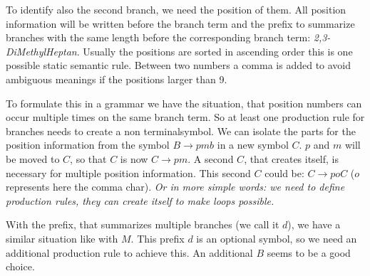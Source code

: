 \documentclass[
fontsize=11pt,
paper=a4,
abstract=true,
numbers=noenddot,
listof=totoc,
bibliography=totoc,
twoside,
open=right,
cleardoublepage=plain,
parskip=half+, %
BCOR=1cm, %
]{scrreprt}
\newcommand{\dashAndSpace}{\textendash \space}
\newcommand{\nonterminal}{non terminal}
\begin{document}
To identify also the second branch, we need the position of them. All position information will be written before the branch term and the prefix to summarize branches with the same length before the corresponding branch term: \emph{2,3-DiMethylHeptan}. Usually the positions are sorted in ascending order \dashAndSpace this is one possible static semantic rule. Between two numbers a comma is added to avoid ambiguous meanings if the positions larger than 9.

To formulate this in a grammar we have the situation, that position numbers can occur multiple times on the same branch term. So at least one production rule for branches needs to create a \nonterminal\space symbol. We can isolate the parts for the position information from the symbol $B \rightarrow pmb$ in a new symbol $C$. $p$ and $m$ will be moved to $C$, so that $C$ is now $C \rightarrow pm$. A second $C$, that creates itself, is necessary for multiple position information. This second $C$ could be: $C \rightarrow poC$ ($o$ represents here the comma char). \emph{Or in more simple words: we need to define production rules, they can create itself to make loops possible.}

With the prefix, that summarizes multiple branches (we call it $d$), we have a similar situation like with $M$. This prefix $d$ is an optional symbol, so we need an additional production rule to achieve this. An additional $B$ seems to be a good choice.
\end{document}
